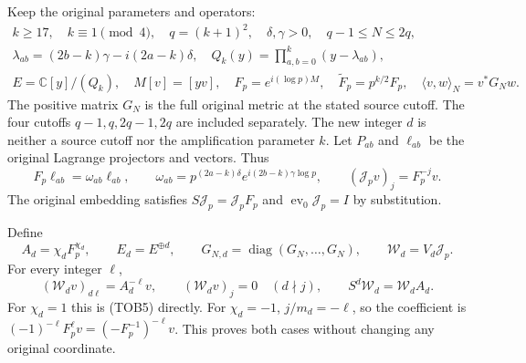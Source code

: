 Keep the original parameters and operators:
\begin{equation}\tag{TOB6}
\begin{gathered}
 k\ge17,\quad k\equiv1\pmod4,\quad q=(k+1)^2,
 \quad\delta,\gamma>0,\quad q-1\le N\le2q,\\
 \lambda_{ab}=(2b-k)\gamma-i(2a-k)\delta,\quad
 Q_k(y)=\prod_{a,b=0}^k(y-\lambda_{ab}),\\
 E=\mathbb C[y]/(Q_k),\quad M[v]=[yv],\quad
 F_p=e^{i(\log p)M},\quad \widetilde F_p=p^{k/2}F_p,
 \quad\langle v,w\rangle_N=v^*G_Nw.
\end{gathered}
\end{equation}
The positive matrix $G_N$ is the full original metric at the stated
source cutoff. The four cutoffs $q-1,q,2q-1,2q$ are included separately.
The new integer $d$ is neither a source cutoff nor the amplification
parameter $k$. Let $P_{ab}$ and $\ell_{ab}$ be the original Lagrange
projectors and vectors. Thus
\begin{equation}\tag{TOB7}
 F_p\ell_{ab}=\omega_{ab}\ell_{ab},\qquad
 \omega_{ab}=p^{(2a-k)\delta}e^{i(2b-k)\gamma\log p},\qquad
 (\mathcal J_pv)_j=F_p^{-j}v.
\end{equation}
The original embedding satisfies $S\mathcal J_p=\mathcal J_pF_p$
and $\operatorname{ev}_0\mathcal J_p=I$ by substitution.

Define
\begin{equation}\tag{TOB8}
 A_d=\chi_d F_p^{\chi_d},\qquad E_d=E^{\oplus d},\qquad
 G_{N,d}=\operatorname{diag}(G_N,\ldots,G_N),
 \qquad \mathcal W_d=V_d\mathcal J_p.
\end{equation}
For every integer $\ell$,
\begin{equation}\tag{TOB9}
 (\mathcal W_dv)_{d\ell}=A_d^{-\ell}v,
 \qquad(\mathcal W_dv)_j=0\quad(d\nmid j),
 \qquad S^d\mathcal W_d=\mathcal W_dA_d.
\end{equation}
For $\chi_d=1$ this is (TOB5) directly. For $\chi_d=-1$,
$j/m_d=-\ell$, so the coefficient is
$(-1)^{-\ell}F_p^\ell v=(-F_p^{-1})^{-\ell}v$.
This proves both cases without changing any original coordinate.

